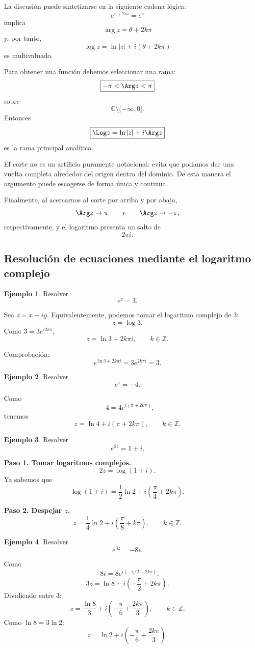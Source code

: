 \documentclass[12pt]{article}
\theoremstyle{definition}
\newtheorem{ejemplo}{Ejemplo}[section]
\theoremstyle{remark}
\begin{document}
La discusión puede sintetizarse en la siguiente cadena lógica:
\[
\boxed{
e^{z+2\pi i}=e^z
}
\]
implica
\[
\boxed{
\arg z=\theta+2k\pi
}
\]
y, por tanto,
\[
\boxed{
\log z=\ln|z|+i(\theta+2k\pi)
}
\]
es multivaluado.

Para obtener una función debemos seleccionar una rama:
\[
\boxed{
-\pi<\Arg z<\pi
}
\]
sobre
\[
\boxed{
\mathbb C\setminus(-\infty,0].
}
\]
Entonces
\[
\boxed{
\Log z=\ln|z|+i\Arg z
}
\]
es la rama principal analítica.

El corte no es un artificio puramente notacional: evita que podamos dar una
vuelta completa alrededor del origen dentro del dominio. De esta manera el
argumento puede escogerse de forma única y continua.

Finalmente, al acercarnos al corte por arriba y por abajo,
\[
\Arg z\to\pi
\qquad\text{y}\qquad
\Arg z\to-\pi,
\]
respectivamente, y el logaritmo presenta un salto de
\[
\boxed{2\pi i.}
\]


\subsection{Resolución de ecuaciones mediante el logaritmo complejo}

\begin{ejemplo}
Resolver
\[
e^z=3.
\]

Sea $z=x+iy$. Equivalentemente, podemos tomar el logaritmo complejo de $3$:
\[
z=\log3.
\]
Como $3=3e^{i2k\pi}$,
\[
\boxed{
z=\ln3+2k\pi i,\qquad k\in\mathbb Z.
}
\]

Comprobación:
\[
e^{\ln3+2k\pi i}
=3e^{2k\pi i}=3.
\]
\end{ejemplo}

\begin{ejemplo}
Resolver
\[
e^z=-4.
\]

Como
\[
-4=4e^{i(\pi+2k\pi)},
\]
tenemos
\[
\boxed{
z=\ln4+i(\pi+2k\pi),\qquad k\in\mathbb Z.
}
\]
\end{ejemplo}

\begin{ejemplo}
Resolver
\[
e^{2z}=1+i.
\]

\textbf{Paso 1. Tomar logaritmos complejos.}
\[
2z=\log(1+i).
\]
Ya sabemos que
\[
\log(1+i)
=
\frac12\ln2
+i\left(\frac{\pi}{4}+2k\pi\right).
\]

\textbf{Paso 2. Despejar $z$.}
\[
\boxed{
z=
\frac14\ln2
+i\left(\frac{\pi}{8}+k\pi\right),
\qquad k\in\mathbb Z.
}
\]
\end{ejemplo}

\begin{ejemplo}
Resolver
\[
e^{3z}=-8i.
\]

Como
\[
-8i=8e^{i(-\pi/2+2k\pi)},
\]
\[
3z=\ln8+i\left(-\frac{\pi}{2}+2k\pi\right).
\]
Dividiendo entre $3$:
\[
\boxed{
z=\frac{\ln8}{3}
+i\left(-\frac{\pi}{6}+\frac{2k\pi}{3}\right),
\qquad k\in\mathbb Z.
}
\]
Como $\ln8=3\ln2$:
\[
\boxed{
z=\ln2+i\left(-\frac{\pi}{6}+\frac{2k\pi}{3}\right).
}
\]
\end{ejemplo}
\end{document}
